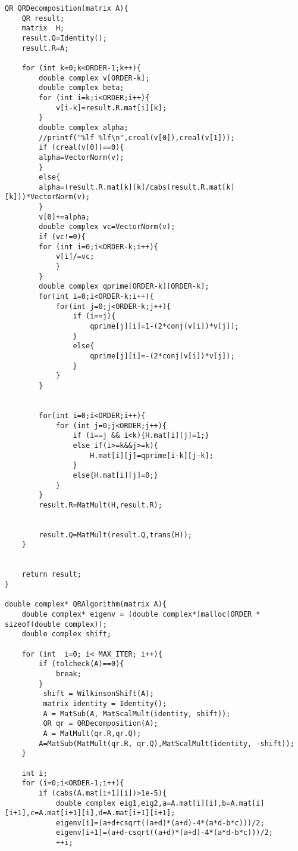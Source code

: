 \documentclass[journal,12pt,onecolumn]{IEEEtran}
\theoremstyle{remark}
\begin{document}
\begin{verbatim}
QR QRDecomposition(matrix A){
    QR result;
    matrix  H;
    result.Q=Identity();
    result.R=A;    

    for (int k=0;k<ORDER-1;k++){
        double complex v[ORDER-k];
        double complex beta;
        for (int i=k;i<ORDER;i++){
            v[i-k]=result.R.mat[i][k];
        }
        double complex alpha;
        //printf("%lf %lf\n",creal(v[0]),creal(v[1]));  
        if (creal(v[0])==0){
        alpha=VectorNorm(v);
        }
        else{
        alpha=(result.R.mat[k][k]/cabs(result.R.mat[k][k]))*VectorNorm(v);
        }
        v[0]+=alpha;
        double complex vc=VectorNorm(v);
        if (vc!=0){
        for (int i=0;i<ORDER-k;i++){
            v[i]/=vc;
            }
        }
        double complex qprime[ORDER-k][ORDER-k];
        for(int i=0;i<ORDER-k;i++){
            for(int j=0;j<ORDER-k;j++){
                if (i==j){
                    qprime[j][i]=1-(2*conj(v[i])*v[j]);
                }
                else{
                    qprime[j][i]=-(2*conj(v[i])*v[j]);
                }
            }
        }
        

        for(int i=0;i<ORDER;i++){
            for (int j=0;j<ORDER;j++){
                if (i==j && i<k){H.mat[i][j]=1;}
                else if(i>=k&&j>=k){
                    H.mat[i][j]=qprime[i-k][j-k];
                }
                else{H.mat[i][j]=0;}
            }
        }
        result.R=MatMult(H,result.R);


        result.Q=MatMult(result.Q,trans(H));
    }


    return result;
}

double complex* QRAlgorithm(matrix A){
    double complex* eigenv = (double complex*)malloc(ORDER * sizeof(double complex));
    double complex shift;

    for (int  i=0; i< MAX_ITER; i++){
        if (tolcheck(A)==0){
            break;
        }
         shift = WilkinsonShift(A);
         matrix identity = Identity();
         A = MatSub(A, MatScalMult(identity, shift));
         QR qr = QRDecomposition(A);
         A = MatMult(qr.R,qr.Q);
        A=MatSub(MatMult(qr.R, qr.Q),MatScalMult(identity, -shift));       
    }
    
    int i;
    for (i=0;i<ORDER-1;i++){
        if (cabs(A.mat[i+1][i])>1e-5){
            double complex eig1,eig2,a=A.mat[i][i],b=A.mat[i][i+1],c=A.mat[i+1][i],d=A.mat[i+1][i+1];
            eigenv[i]=(a+d+csqrt((a+d)*(a+d)-4*(a*d-b*c)))/2;
            eigenv[i+1]=(a+d-csqrt((a+d)*(a+d)-4*(a*d-b*c)))/2;
            ++i;
            

\end{verbatim}
\end{document}

